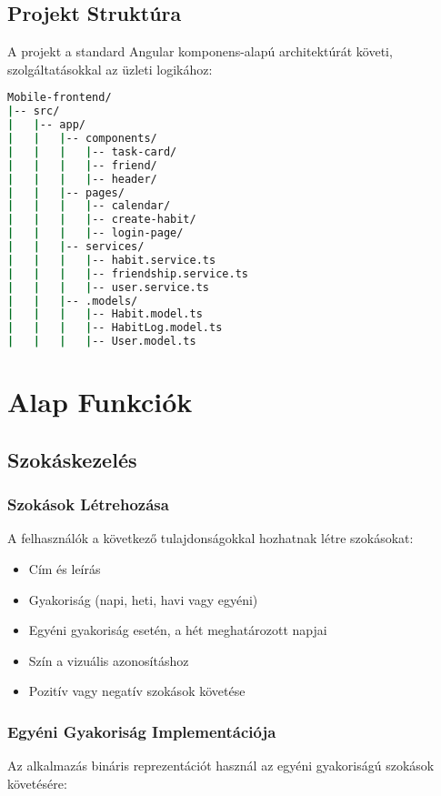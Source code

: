 \documentclass[12pt,a4paper]{report}
\begin{document}
\section{Projekt Struktúra}
A projekt a standard Angular komponens-alapú architektúrát követi, szolgáltatásokkal az üzleti logikához:

\begin{lstlisting}[language=bash]
Mobile-frontend/
|-- src/
|   |-- app/
|   |   |-- components/
|   |   |   |-- task-card/
|   |   |   |-- friend/
|   |   |   |-- header/
|   |   |-- pages/
|   |   |   |-- calendar/
|   |   |   |-- create-habit/
|   |   |   |-- login-page/
|   |   |-- services/
|   |   |   |-- habit.service.ts
|   |   |   |-- friendship.service.ts
|   |   |   |-- user.service.ts
|   |   |-- .models/
|   |   |   |-- Habit.model.ts
|   |   |   |-- HabitLog.model.ts
|   |   |   |-- User.model.ts
\end{lstlisting}

\chapter{Alap Funkciók}

\section{Szokáskezelés}
\subsection{Szokások Létrehozása}
A felhasználók a következő tulajdonságokkal hozhatnak létre szokásokat:
\begin{itemize}
    \item Cím és leírás
    \item Gyakoriság (napi, heti, havi vagy egyéni)
    \item Egyéni gyakoriság esetén, a hét meghatározott napjai
    \item Szín a vizuális azonosításhoz
    \item Pozitív vagy negatív szokások követése
\end{itemize}

\subsection{Egyéni Gyakoriság Implementációja}
Az alkalmazás bináris reprezentációt használ az egyéni gyakoriságú szokások követésére:
\end{document}
